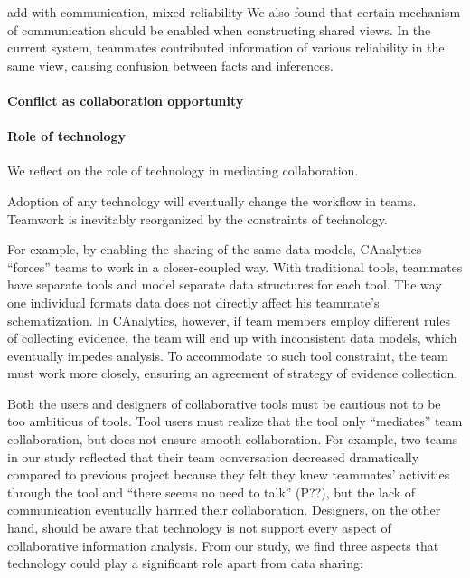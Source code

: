 add with communication, mixed reliability 
We also found that certain mechanism of communication should be enabled when constructing shared views. In the current system, teammates contributed information of various reliability in the same view, causing confusion between facts and inferences. 


\paragraph{Conflict as collaboration opportunity }

\paragraph{Role of technology}
We reflect on the role of technology in mediating collaboration. 

Adoption of any technology will eventually change the workflow in teams. Teamwork is inevitably reorganized by the constraints of technology.

For example, by enabling the sharing of the same data models, CAnalytics ``forces'' teams to work in a closer-coupled way. With traditional tools, teammates have separate tools and model separate data structures for each tool. The way one individual formats data does not directly affect his teammate's schematization. In CAnalytics, however, if team members employ different rules of collecting evidence, the team will end up with inconsistent data models, which eventually impedes analysis. To accommodate to such tool constraint, the team must work more closely, ensuring an agreement of strategy of evidence collection.

Both the users and designers of collaborative tools must be cautious not to be too ambitious of tools. Tool users must realize that the tool only ``mediates'' team collaboration, but does not ensure smooth collaboration. For example, two teams in our study reflected that their team conversation decreased dramatically compared to previous project because they felt they knew teammates' activities through the tool and ``there seems no need to talk'' (P??), but the lack of communication eventually harmed their collaboration. Designers, on the other hand, should be aware that technology is not support every aspect of collaborative information analysis. From our study, we find three aspects that technology could play a significant role apart from data sharing:

